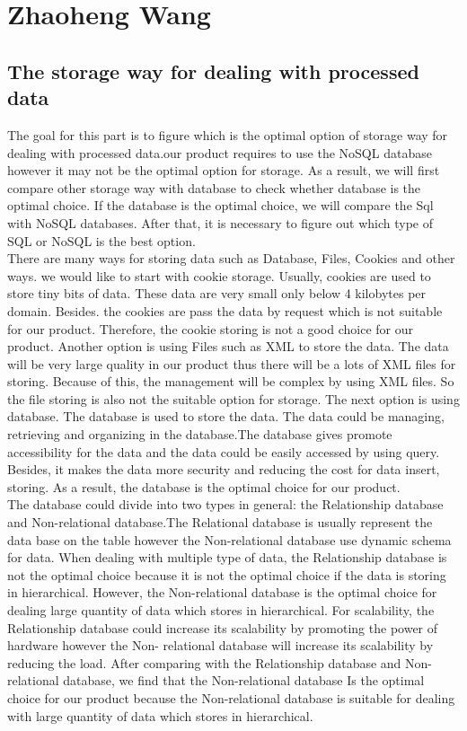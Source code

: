 \documentclass[10pt,draftclsnofoot,onecolumn,journal,compsoc]{IEEEtran}
\begin{document}
    
    
    \section{Zhaoheng Wang}
        \subsection{The storage way for dealing with processed data}
        The goal for this part is to figure which is the optimal option of storage way for dealing with  processed data.our product requires to use the NoSQL database however it may not be the optimal option for storage. As a result, we will first compare other storage way with database to check whether database is the optimal choice. If the database is the optimal choice, we will compare the Sql with NoSQL databases. After that, it is necessary to figure out which type of SQL or NoSQL is the best option.\\
    
        \noindent There are many ways for storing data such as Database, Files, Cookies and other ways. we would like to start with cookie storage. Usually, cookies are used to store tiny bits of data. These data are very small only below 4 kilobytes per domain\cite{W1}. Besides. the cookies are pass the data by request which is not suitable for our product. Therefore, the cookie storing is not a good choice for our product. Another option is using Files such as XML to store the data. The data will be very large quality in our product thus there will be a lots of XML files for storing. Because of this, the management will be complex by using XML files. So the file storing is also not the suitable option for storage. The next option is using database. The database is used to store the data. The data could be managing, retrieving and organizing in the database\cite{W2}.The database gives promote accessibility for the data and the data could be easily accessed by using query. Besides, it makes the data more security and reducing the cost for data insert, storing\cite{W3}. As a result, the database is the optimal choice for our product.\\
        
        \noindent The database could divide into two types in general: the Relationship database and Non-relational database.The Relational database is usually represent the data base on the table however the Non-relational database use dynamic schema for data. When dealing with multiple type of data, the Relationship database is not the optimal choice because it is not the optimal choice if the data is storing in hierarchical. However, the Non-relational database is the optimal choice for  dealing large quantity of data which stores in hierarchical. For scalability, the Relationship database could increase its scalability by promoting the power of hardware however the Non- relational database will increase its scalability by reducing the load. After comparing with the Relationship database and Non-relational database, we find that the Non-relational database Is the optimal choice for our product because the Non-relational database is suitable for dealing with large quantity of data which stores in hierarchical\cite{W4}.
	
\end{document}
